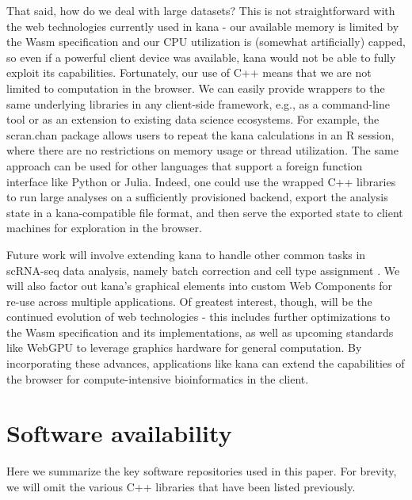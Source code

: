 \documentclass{article}
\begin{document}
That said, how do we deal with large datasets?
This is not straightforward with the web technologies currently used in kana -
our available memory is limited by the Wasm specification and our CPU utilization is (somewhat artificially) capped,
so even if a powerful client device was available, kana would not be able to fully exploit its capabilities.
Fortunately, our use of C++ means that we are not limited to computation in the browser.
We can easily provide wrappers to the same underlying libraries in any client-side framework, e.g., as a command-line tool or as an extension to existing data science ecosystems.
For example, the scran.chan package \cite{scranchan} allows users to repeat the kana calculations in an R session,
where there are no restrictions on memory usage or thread utilization.
The same approach can be used for other languages that support a foreign function interface like Python or Julia.
Indeed, one could use the wrapped C++ libraries to run large analyses on a sufficiently provisioned backend, 
export the analysis state in a kana-compatible file format,
and then serve the exported state to client machines for exploration in the browser. 

Future work will involve extending kana to handle other common tasks in scRNA-seq data analysis,
namely batch correction \cite{haghverdi2018batch} and cell type assignment \cite{aran2019reference}.
We will also factor out kana's graphical elements into custom Web Components for re-use across multiple applications. 
Of greatest interest, though, will be the continued evolution of web technologies -
this includes further optimizations to the Wasm specification and its implementations,
as well as upcoming standards like WebGPU to leverage graphics hardware for general computation.
By incorporating these advances, applications like kana can extend the capabilities of the browser for compute-intensive bioinformatics in the client.

\section{Software availability}

Here we summarize the key software repositories used in this paper.
For brevity, we will omit the various C++ libraries that have been listed previously.
\end{document}
